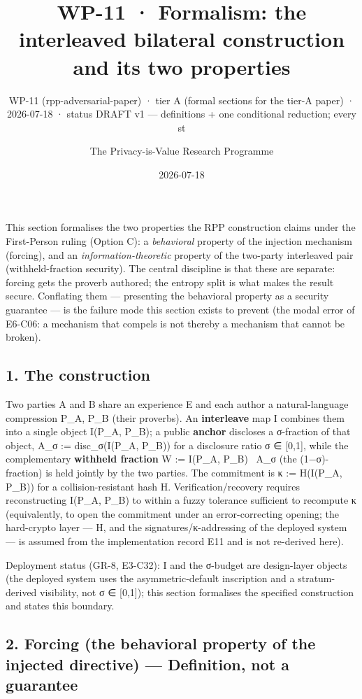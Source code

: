 \documentclass[
  11pt,
]{article}
\title{WP-11 · Formalism: the interleaved bilateral construction and its
two properties}
\subtitle{WP-11 (rpp-adversarial-paper) · tier A (formal sections for
the tier-A paper) · 2026-07-18 · status DRAFT v1 --- definitions + one
conditional reduction; every st}
\author{The Privacy-is-Value Research Programme}
\date{2026-07-18}
\begin{document}
\maketitle

This section formalises the two properties the RPP construction claims
under the First-Person ruling (Option C): a \emph{behavioral} property
of the injection mechanism (forcing), and an
\emph{information-theoretic} property of the two-party interleaved pair
(withheld-fraction security). The central discipline is that these are
separate: forcing gets the proverb authored; the entropy split is what
makes the result secure. Conflating them --- presenting the behavioral
property as a security guarantee --- is the failure mode this section
exists to prevent (the modal error of E6-C06: a mechanism that compels
is not thereby a mechanism that cannot be broken).

\subsection{1. The construction}\label{the-construction}

Two parties A and B share an experience E and each author a
natural-language compression P\_A, P\_B (their proverbs). An
\textbf{interleave} map I combines them into a single object I(P\_A,
P\_B); a public \textbf{anchor} discloses a σ-fraction of that object,
A\_σ := disc\_σ(I(P\_A, P\_B)) for a disclosure ratio σ ∈ {[}0,1{]},
while the complementary \textbf{withheld fraction} W := I(P\_A, P\_B)
~A\_σ (the (1−σ)-fraction) is held jointly by the two parties. The
commitment is κ := H(I(P\_A, P\_B)) for a collision-resistant hash H.
Verification/recovery requires reconstructing I(P\_A, P\_B) to within a
fuzzy tolerance sufficient to recompute κ (equivalently, to open the
commitment under an error-correcting opening; the hard-crypto layer ---
H, and the signatures/κ-addressing of the deployed system --- is assumed
from the implementation record E11 and is not re-derived here).

Deployment status (GR-8, E3-C32): I and the σ-budget are design-layer
objects (the deployed system uses the asymmetric-default inscription and
a stratum-derived visibility, not σ ∈ {[}0,1{]}); this section
formalises the specified construction and states this boundary.

\subsection{2. Forcing (the behavioral property of the injected
directive) --- Definition, not a
guarantee}\label{forcing-the-behavioral-property-of-the-injected-directive-definition-not-a-guarantee}
\end{document}

